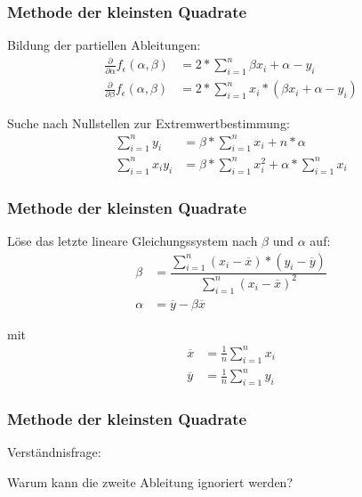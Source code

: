 
\begin{frame}
\frametitle{Methode der kleinsten Quadrate}

Bildung der partiellen Ableitungen:
\begin{align}
	\frac{\partial}{\partial \alpha} f_{\epsilon}(\alpha, \beta) &= 2 * \sum_{i=1}^{n} \beta x_i + \alpha - y_i \\
	\frac{\partial}{\partial \beta} f_{\epsilon}(\alpha, \beta) &= 2 * \sum_{i=1}^{n} x_i * (\beta x_i + \alpha - y_i)
\end{align}

\setcounter{equation}{0}

Suche nach Nullstellen zur Extremwertbestimmung:
\begin{align}
	\sum_{i=1}^{n} y_i &= \beta * \sum_{i=1}^{n} x_i + n * \alpha \\
	\sum_{i=1}^{n} x_i y_i &= \beta * \sum_{i=1}^{n} x_i^2 + \alpha * \sum_{i=1}^{n} x_i
\end{align}

\end{frame}


\begin{frame}
\frametitle{Methode der kleinsten Quadrate}

Löse das letzte lineare Gleichungssystem nach $\beta$ und $\alpha$ auf:
\begin{align*}
	\beta &= \dfrac{\sum_{i=1}^{n} (x_i - \overline{x}) * (y_i - \overline{y})}{\sum_{i=1}^{n} (x_i - \overline{x})^2} \\
	\alpha &= \overline{y} - \beta \overline{x}
\end{align*}

mit
\begin{align*}
	\overline{x} &= \tfrac{1}{n} \sum_{i=1}^{n} x_i \\
	\overline{y} &= \tfrac{1}{n} \sum_{i=1}^{n} y_i
\end{align*}

\end{frame}


\begin{frame}
\frametitle{Methode der kleinsten Quadrate}

\vfill
\begin{center}
	Verständnisfrage:
	\vspace{1mm}
	
	{\Large Warum kann die zweite Ableitung ignoriert werden?}
\end{center}
\vfill

\end{frame}

